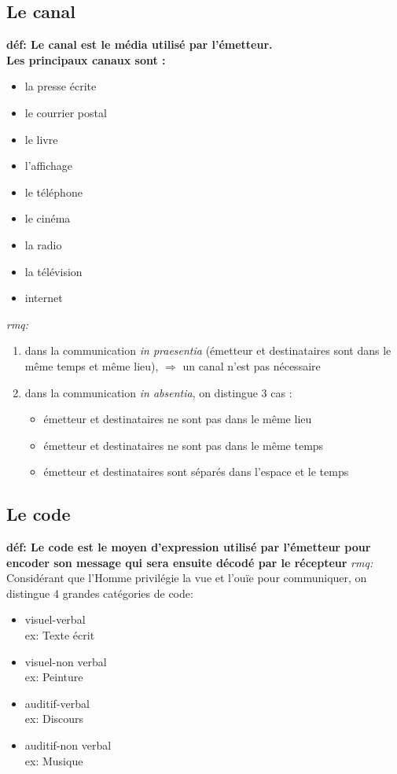 \documentclass[a4paper,11pt]{report}
\begin{document}
\subsection{Le canal}
\textbf{déf: Le canal est le média utilisé par l'émetteur. \\ Les principaux canaux sont :}
\begin{itemize}
    \item la presse écrite
    \item le courrier postal
    \item le livre
    \item l'affichage
    \item le téléphone
    \item le cinéma
    \item la radio
    \item la télévision
    \item internet \\
\end{itemize}
\textit{rmq:} 
\begin{enumerate}
    \item dans la communication \textit{in praesentia} (émetteur et destinataires sont dans le même temps et même lieu), $\Rightarrow$ un canal n'est pas nécessaire
    \item dans la communication \textit{in absentia}, on distingue 3 cas :
    \begin{itemize}
        \item émetteur et destinataires ne sont pas dans le même lieu
        \item émetteur et destinataires ne sont pas dans le même temps
        \item émetteur et destinataires sont séparés dans l'espace et le temps
    \end{itemize}
\end{enumerate}

\subsection{Le code}
\textbf{déf: Le code est le moyen d'expression utilisé par l'émetteur pour encoder son message qui sera ensuite décodé par le récepteur}
\textit{rmq:} Considérant que l'Homme privilégie la vue et l'ouïe pour communiquer, on distingue 4 grandes catégories de code:
\begin{itemize}
    \item visuel-verbal \\
    ex: Texte écrit
    \item visuel-non verbal \\
    ex: Peinture
    \item auditif-verbal \\
    ex: Discours
    \item auditif-non verbal \\
    ex: Musique
\end{itemize}
\end{document}
